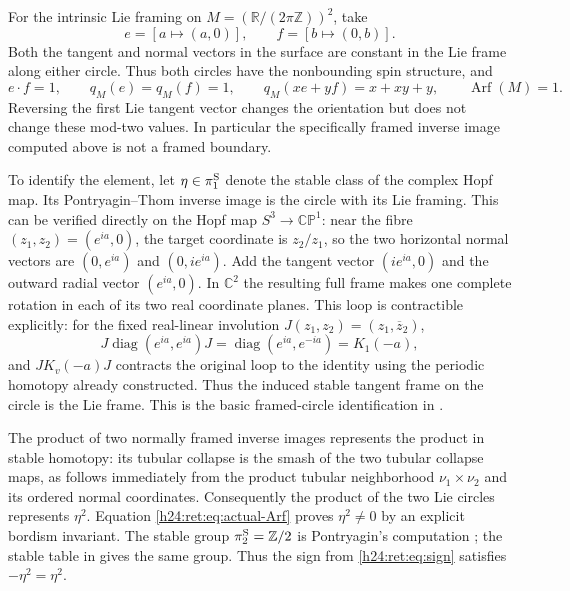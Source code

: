 For the intrinsic Lie framing on
\(M=(\mathbb R/(2\pi\mathbb Z))^2\), take
\[
 e=[a\mapsto(a,0)],\qquad f=[b\mapsto(0,b)].
\]
Both the tangent and normal vectors in the surface are constant in
the Lie frame along either circle.  Thus both circles have the
nonbounding spin structure, and
\begin{equation}
 e\mathbin{\cdot}f=1,\qquad q_M(e)=q_M(f)=1,
 \qquad q_M(xe+yf)=x+xy+y,
 \qquad \operatorname{Arf}(M)=1.
 \label{h24:ret:eq:actual-Arf}
\end{equation}
Reversing the first Lie tangent vector changes the orientation but
does not change these mod-two values.  In particular the
specifically framed inverse image computed above is not a framed
boundary.

To identify the element, let \(\eta\in\pi_1^{\rm S}\) denote the
stable class of the complex Hopf map.  Its Pontryagin--Thom inverse
image is the circle with its Lie framing.  This can be verified
directly on the Hopf map \(S^3\to\mathbb{CP}^1\): near the fibre
\((z_1,z_2)=(e^{ia},0)\), the target coordinate is \(z_2/z_1\), so
the two horizontal normal vectors are \((0,e^{ia})\) and
\((0,ie^{ia})\).  Add the tangent vector \((ie^{ia},0)\) and the
outward radial vector \((e^{ia},0)\).  In \(\mathbb C^2\) the resulting
full frame makes one complete rotation in each of its two real
coordinate planes.  This loop is contractible explicitly: for the
fixed real-linear involution \(J(z_1,z_2)=(z_1,\overline z_2)\),
\[
 J\operatorname{diag}(e^{ia},e^{ia})J=\operatorname{diag}(e^{ia},e^{-ia})=K_1(-a),
\]
and \(JK_v(-a)J\) contracts the original loop to the identity using
the periodic homotopy already constructed.  Thus the induced stable
tangent frame on the circle is the Lie frame.  This is the basic
framed-circle identification in \cite{h24:retbib:Pontryagin1955}.

The product of two normally framed inverse images represents the
product in stable homotopy: its tubular collapse is the smash of
the two tubular collapse maps, as follows immediately from the
product tubular neighborhood \(\nu_1\times\nu_2\) and its ordered
normal coordinates.  Consequently the product of the two Lie
circles represents \(\eta^2\).  Equation \eqref{h24:ret:eq:actual-Arf}
proves \(\eta^2\ne0\) by an explicit bordism invariant.  The
stable group \(\pi_2^{\rm S}=\mathbb Z/2\) is Pontryagin's computation
\cite{h24:retbib:Pontryagin1950,h24:retbib:Pontryagin1955}; the stable table in
\cite[pp.~384--385]{h24:retbib:Hatcher} gives the same group.  Thus the sign from
\eqref{h24:ret:eq:sign} satisfies \(-\eta^2=\eta^2\).

